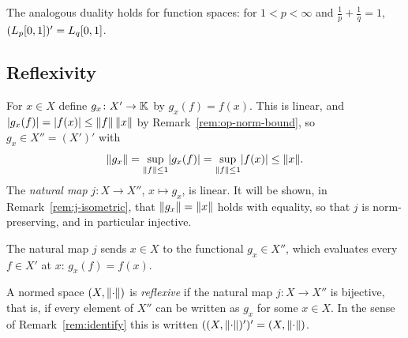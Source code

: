 \begin{remark}\label{rem:Lp-duality}
The analogous duality holds for function spaces: for $1 < p < \infty$ and
$\frac{1}{p} + \frac{1}{q} = 1$, $(L_{p}[0,1])' = L_{q}[0,1]$.
\end{remark}

\subsection{Reflexivity}

\begin{remark}\label{rem:natural-map}
For $x \in X$ define $g_x \colon X' \to \mathbb{K}$ by $g_x(f) = f(x)$. This is
linear, and $\lvert g_x(f)\rvert = \lvert f(x)\rvert \le \lVert f\rVert\,\lVert x\rVert$ by
Remark~\ref{rem:op-norm-bound}, so $g_x \in X'' = (X')'$ with
\[
  \lVert g_x\rVert = \sup_{\lVert f\rVert \le 1} \lvert g_x(f)\rvert
  = \sup_{\lVert f\rVert \le 1} \lvert f(x)\rvert \le \lVert x\rVert .
\]
The \emph{natural map} $j \colon X \to X''$, $x \mapsto g_x$, is linear. It
will be shown, in Remark~\ref{rem:j-isometric}, that $\lVert g_x\rVert = \lVert x\rVert$
holds with equality, so that $j$ is norm-preserving, and in particular
injective.
\end{remark}

\begin{nfigure}{The natural map $j$ sends $x \in X$ to the functional
$g_x \in X''$, which evaluates every $f \in X'$ at $x$: $g_x(f) = f(x)$.}
\end{nfigure}

\begin{definition}\label{def:reflexive}
A normed space $(X, \lVert\cdot\rVert)$ is \emph{reflexive} if the natural map
$j \colon X \to X''$ is bijective, that is, if every element of $X''$ can be
written as $g_x$ for some $x \in X$. In the sense of
Remark~\ref{rem:identify} this is written
$((X, \lVert\cdot\rVert)')' = (X, \lVert\cdot\rVert)$.
\end{definition}

